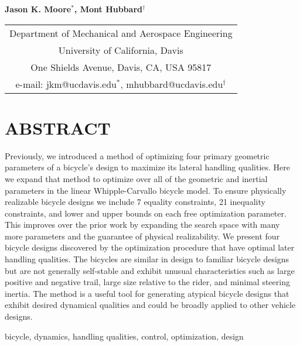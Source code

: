\documentclass{bmd2019p}
\begin{document}
\begin{center}
\end{center}

\begin{center}
  \normalsize{\bf{Jason K. Moore$^{*}$, Mont Hubbard$^\dag$}}
\end{center}

\begin{center}
  \begin{tabular}{c}
    Department of Mechanical and Aerospace Engineering\\
    University of California, Davis\\
    One Shields Avenue, Davis, CA, USA 95817\\
    e-mail: jkm@ucdavis.edu$^{*}$, mhubbard@ucdavis.edu$^\dag$
  \end{tabular}
\end{center}

\section*{ABSTRACT}
%
Previously, we introduced a method of optimizing four primary geometric
parameters of a bicycle's design to maximize its lateral handling qualities.
Here we expand that method to optimize over all of the geometric and inertial
parameters in the linear Whipple-Carvallo bicycle model. To ensure physically
realizable bicycle designs we include 7 equality constraints, 21 inequality
constraints, and lower and upper bounds on each free optimization
parameter. This improves over the prior work by expanding the search space with
many more parameters and the guarantee of physical realizability. We present
four bicycle designs discovered by the optimization procedure that have optimal
later handling qualities. The bicycles are similar in design to familiar
bicycle designs but are not generally self-stable and exhibit unusual
characteristics such as large positive and negative trail, large size relative
to the rider, and minimal steering inertia. The method is a useful tool for
generating atypical bicycle designs that exhibit desired dynamical qualities
and could be broadly applied to other vehicle designs.
%
\begin{keywords}
  bicycle,
  dynamics,
  handling qualities,
  control,
  optimization,
  design
\end{keywords}
\end{document}
